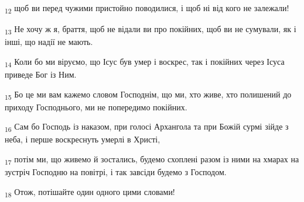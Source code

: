 \begin{tcolorbox}
\textsubscript{12} щоб ви перед чужими пристойно поводилися, і щоб ні від кого не залежали!
\end{tcolorbox}
\begin{tcolorbox}
\textsubscript{13} Не хочу ж я, браття, щоб не відали ви про покійних, щоб ви не сумували, як і інші, що надії не мають.
\end{tcolorbox}
\begin{tcolorbox}
\textsubscript{14} Коли бо ми віруємо, що Ісус був умер і воскрес, так і покійних через Ісуса приведе Бог із Ним.
\end{tcolorbox}
\begin{tcolorbox}
\textsubscript{15} Бо це ми вам кажемо словом Господнім, що ми, хто живе, хто полишений до приходу Господнього, ми не попередимо покійних.
\end{tcolorbox}
\begin{tcolorbox}
\textsubscript{16} Сам бо Господь із наказом, при голосі Архангола та при Божій сурмі зійде з неба, і перше воскреснуть умерлі в Христі,
\end{tcolorbox}
\begin{tcolorbox}
\textsubscript{17} потім ми, що живемо й зостались, будемо схоплені разом із ними на хмарах на зустріч Господню на повітрі, і так завсіди будемо з Господом.
\end{tcolorbox}
\begin{tcolorbox}
\textsubscript{18} Отож, потішайте один одного цими словами!
\end{tcolorbox}
